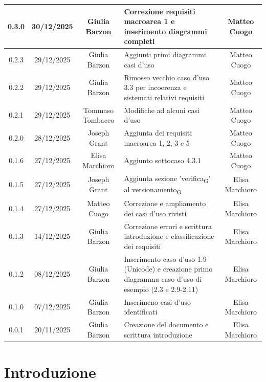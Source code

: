 \documentclass[11pt,a4paper]{article}
\newcommand{\gls}[1]{#1\textsubscript{G}}
\begin{document}
\begin{longtable}[H]{|c|c|c|>{\raggedright\arraybackslash}p{}|c|}
        0.3.0 & 30/12/2025 & Giulia Barzon & Correzione requisiti macroarea 1 e inserimento diagrammi completi & Matteo Cuogo \\
        \hline
        0.2.3 & 29/12/2025 & Giulia Barzon & Aggiunti primi diagrammi casi d'uso &  Matteo Cuogo \\
        \hline
        0.2.2 & 29/12/2025 & Giulia Barzon & Rimosso vecchio caso d'uso 3.3 per incoerenza e sistemati relativi requisiti & Matteo Cuogo \\
        \hline
        0.2.1 & 29/12/2025 & Tommaso Tombacco & Modifiche ad alcuni casi d'uso &  Matteo Cuogo\\ 
        \hline
        0.2.0 & 28/12/2025 & Joseph Grant & Aggiunta dei requisiti macroarea 1, 2, 3 e 5 &  Matteo Cuogo\\ 
        \hline
        0.1.6 & 27/12/2025 & Elisa Marchioro & Aggiunto sottocaso 4.3.1 & Matteo Cuogo\\ 
        \hline
        0.1.5 & 27/12/2025 & Joseph Grant & Aggiunta sezione '\gls{verifica}' al \gls{versionamento} & Elisa Marchioro\\ 
        \hline
        0.1.4 & 27/12/2025 & Matteo Cuogo & Correzione e ampliamento dei casi d'uso rivisti & Elisa Marchioro\\
        \hline
        0.1.3 & 14/12/2025 & Giulia Barzon & Correzione errori e scrittura introduzione e classificazione dei requisiti & Elisa Marchioro\\
        \hline
        0.1.2 & 08/12/2025 & Giulia Barzon & Inserimento caso d'uso 1.9 (Unicode) e creazione primo diagramma caso d'uso di esempio (2.3 e 2.9-2.11) & Elisa Marchioro\\
        \hline
        0.1.0 & 07/12/2025 & Giulia Barzon & Inserimeno casi d'uso identificati & Elisa Marchioro\\
        \hline
        0.0.1 & 20/11/2025 & Giulia Barzon & Creazione del documento e scrittura introduzione & Elisa Marchioro\\
        \hline
\end{longtable}

\newpage

\tableofcontents
\thispagestyle{empty}
\newpage

\setcounter{page}{1}

\section{Introduzione}
\end{document}
